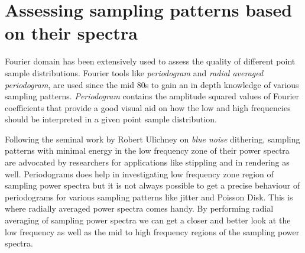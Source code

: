 %
%
%
\section{Assessing sampling patterns based on their spectra}
Fourier domain has been extensively used to assess the quality of different point sample distributions. 
Fourier tools like \emph{periodogram} and \emph{radial averaged periodogram}, are used since the mid 80s 
to gain an in depth knowledge of various sampling patterns. \emph{Periodogram} contains the amplitude squared 
values of Fourier coefficients that provide a good visual aid on how the low and high frequencies should be 
interpreted in a given point sample distribution. 

Following the seminal work by Robert Ulichney on \emph{blue noise} dithering, sampling patterns with minimal energy in the low frequency zone of their power spectra are advocated by researchers for applications like stippling and in rendering as well. 
Periodograms does help in investigating low frequency zone region of sampling power spectra but 
it is not always possible to get a precise behaviour of periodograms for various sampling patterns like 
jitter and Poisson Disk. This is where radially averaged power spectra comes 
handy. By performing radial averaging of sampling power spectra we can get a closer and better look at the low frequency as well as the mid to high frequency regions of the sampling power spectra.
